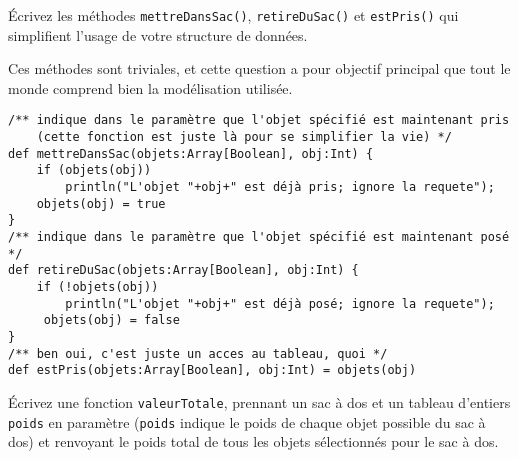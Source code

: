 \documentclass[10pt]{article}\usepackage[nu]{esial}
\begin{document}



\Question Écrivez les méthodes \texttt{mettreDansSac()}, \texttt{retireDuSac()} et
\texttt{estPris()} qui simplifient l'usage de votre structure de données.

\begin{Reponse}
  Ces méthodes sont triviales, et cette question a pour objectif principal que
  tout le monde comprend bien la modélisation utilisée.
  \begin{Verbatim}
/** indique dans le paramètre que l'objet spécifié est maintenant pris
    (cette fonction est juste là pour se simplifier la vie) */
def mettreDansSac(objets:Array[Boolean], obj:Int) {
    if (objets(obj)) 
        println("L'objet "+obj+" est déjà pris; ignore la requete");
    objets(obj) = true
}
/** indique dans le paramètre que l'objet spécifié est maintenant posé */
def retireDuSac(objets:Array[Boolean], obj:Int) {
    if (!objets(obj)) 
        println("L'objet "+obj+" est déjà posé; ignore la requete");
     objets(obj) = false
}
/** ben oui, c'est juste un acces au tableau, quoi */
def estPris(objets:Array[Boolean], obj:Int) = objets(obj)
  \end{Verbatim}
\end{Reponse}

\Question Écrivez une fonction \texttt{valeurTotale}, prennant un sac à dos et
un tableau d'entiers \texttt{poids} en paramètre (\texttt{poids} indique le
poids de chaque objet possible du sac à dos) et renvoyant le poids total de tous
les objets sélectionnés pour le sac à dos.
\end{document}
